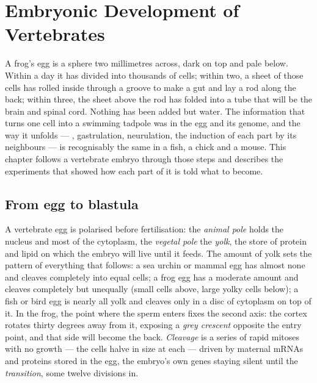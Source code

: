 \chapter{Embryonic Development of Vertebrates}\label{ch:b2:vertebrate-development}

A frog's egg is a sphere two millimetres across, dark on top and
pale below. Within a day it has divided into thousands of cells;
within two, a sheet of those cells has rolled inside through a
groove to make a gut and lay a rod along the back; within three, the
sheet above the rod has folded into a tube that will be the brain
and spinal cord. Nothing has been added but water. The information
that turns one cell into a swimming tadpole was in the egg and its
genome, and the way it unfolds --- , gastrulation,
neurulation, the induction of each part by its neighbours --- is
recognisably the same in a fish, a chick and a mouse. This chapter
follows a vertebrate embryo through those steps and describes the
experiments that showed how each part of it is told what to become.

\section{From egg to blastula}

\begin{definition}\label{def:b2:vertebrate-development:egg}
A vertebrate egg is polarised before fertilisation: the
\emph{animal pole} holds the nucleus and most of the cytoplasm, the
\emph{vegetal pole} the \emph{yolk}, the store of protein and lipid
on which the embryo will live until it feeds. The amount of yolk
sets the pattern of everything that follows: a sea urchin or mammal
egg has almost none and cleaves completely into equal cells; a frog
egg has a moderate amount and cleaves completely but unequally
(small cells above, large yolky cells below); a fish or bird egg is
nearly all yolk and cleaves only in a disc of cytoplasm on top of it.
In the frog, the point where the sperm enters fixes the second axis:
the cortex rotates thirty degrees away from it, exposing a
\emph{grey crescent} opposite the entry point, and that side will
become the back. \emph{Cleavage} is a series of rapid mitoses with
no growth --- the cells halve in size at each --- driven by maternal
mRNAs and proteins stored in the egg, the embryo's own genes staying
silent until the \emph{ transition}, some twelve
divisions in.
\end{definition}

